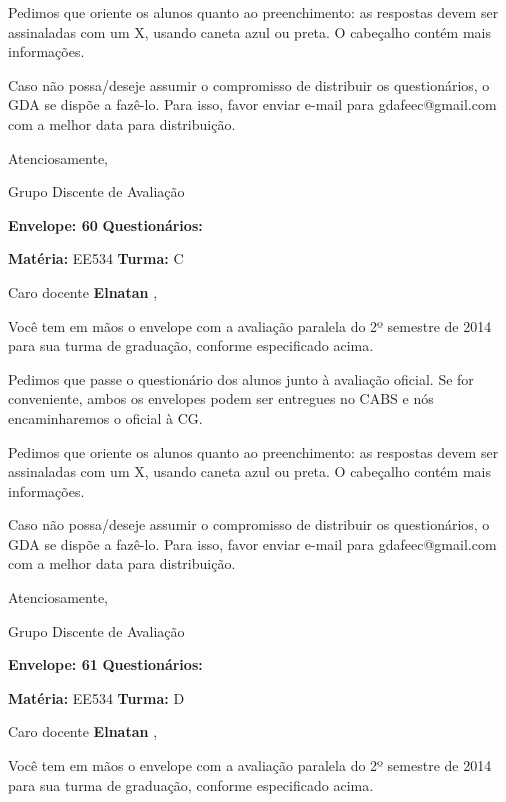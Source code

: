 \documentclass[a5paper]{letter}
\begin{document}
Pedimos que oriente os alunos quanto ao preenchimento: as respostas devem ser assinaladas com um X, usando caneta azul ou preta. O cabeçalho contém mais informações.

	Caso não possa/deseje assumir o compromisso de distribuir os questionários, o GDA se dispõe a fazê-lo. Para isso, favor enviar e-mail para gdafeec@gmail.com com a melhor data para distribuição.


Atenciosamente, 

Grupo Discente de Avaliação

\vspace{0.5cm}

{\bf Envelope: 60 }		\hfill	{\bf Questionários:} \hspace{2cm}

\newpage
\thispagestyle{empty}

\hfill {\bf Matéria:} EE534 {\bf Turma:} C

Caro docente {\bf Elnatan }, 

	Você tem em mãos o envelope com a avaliação paralela do 2º semestre de 2014 para sua turma de graduação, conforme especificado acima.

	Pedimos que passe o questionário dos alunos junto à avaliação oficial. Se for conveniente, ambos os envelopes podem ser entregues no CABS e nós encaminharemos o oficial à CG.

Pedimos que oriente os alunos quanto ao preenchimento: as respostas devem ser assinaladas com um X, usando caneta azul ou preta. O cabeçalho contém mais informações.

	Caso não possa/deseje assumir o compromisso de distribuir os questionários, o GDA se dispõe a fazê-lo. Para isso, favor enviar e-mail para gdafeec@gmail.com com a melhor data para distribuição.


Atenciosamente, 

Grupo Discente de Avaliação

\vspace{0.5cm}

{\bf Envelope: 61 }		\hfill	{\bf Questionários:} \hspace{2cm}

\newpage
\thispagestyle{empty}

\hfill {\bf Matéria:} EE534 {\bf Turma:} D

Caro docente {\bf Elnatan }, 

	Você tem em mãos o envelope com a avaliação paralela do 2º semestre de 2014 para sua turma de graduação, conforme especificado acima.
\end{document}
